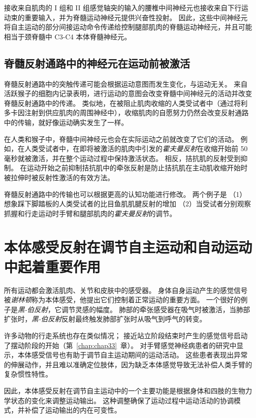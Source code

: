 接收来自肌肉的 I 组和 II 组感觉轴突的输入的腰椎中间神经元也接收来自下行运动束的重要输入，并为脊髓运动神经元提供兴奋性投射。
因此，这些中间神经元将自主运动的部分间接运动命令传递给控制腿部肌肉的脊髓运动神经元，并且可能相当于颈脊髓中 C3-C4 本体脊髓神经元。



\subsection{脊髓反射通路中的神经元在运动前被激活}

脊髓反射通路中的突触传递可能会根据运动意图而发生变化，与运动无关。
来自活跃猴子的细胞内记录表明，进行运动的意图会改变脊髓中间神经元的活动并改变脊髓反射通路中的传递。
类似地，在被阻止肌肉收缩的人类受试者中（通过将利多卡因注射到供应肌肉的周围神经中），收缩肌肉的自愿努力仍然会改变反射通路中的传输，就好像运动确实发生了一样。


在人类和猴子中，脊髓中间神经元也会在实际运动之前就改变了它们的活动。
例如，在人类受试者中，在即将被激活的肌肉中引发的\textit{霍夫曼反射}在收缩开始前 50 毫秒就被激活，并在整个运动过程中保持激活状态。
相反，拮抗肌的反射受到抑制。
在运动开始之前抑制拮抗肌中的牵张反射是防止拮抗肌在主动肌收缩开始时被拉伸时被反射性激活的有效方法。


脊髓反射通路中的传输也可以根据更高的认知功能进行修改。
两个例子是
（1） 想象踩下脚踏板的人类受试者的比目鱼肌肌腱反射的增加 
（2）当受试者分别观察抓握和行走运动时手臂和腿部肌肉的\textit{霍夫曼反射}的调节。



\section{本体感受反射在调节自主运动和自动运动中起着重要作用}

所有运动都会激活肌肉、关节和皮肤中的感受器。
身体自身运动产生的感觉信号被\textit{谢林顿}称为本体感受，他提出它们控制着正常运动的重要方面。
一个很好的例子是\textit{黑-伯反射}，它调节灵感的幅度。
肺部的牵张感受器在吸气时被激活，当肺部扩张时，\textit{黑-伯反射}反射最终触发肺部扩张时从吸气到呼气的转变。


许多动物的行走系统也存在类似情况；
接近站立阶段结束时产生的感觉信号启动了摆动阶段的开始（第~\ref{chap:chap33}~章）。
对手臂感觉神经病患者的研究中显示，本体感受信号也有助于调节自主运动期间的运动活动。
这些患者表现出异常的伸展动作，并且难以准确定位肢体，因为缺乏本体感觉导致无法补偿人类手臂的复杂惯性特性。


因此，本体感受反射在调节自主运动中的一个主要功能是根据身体和四肢的生物力学状态的变化来调整运动输出。
这种调整确保了运动过程中运动活动的协调模式，并补偿了运动输出的内在可变性。



